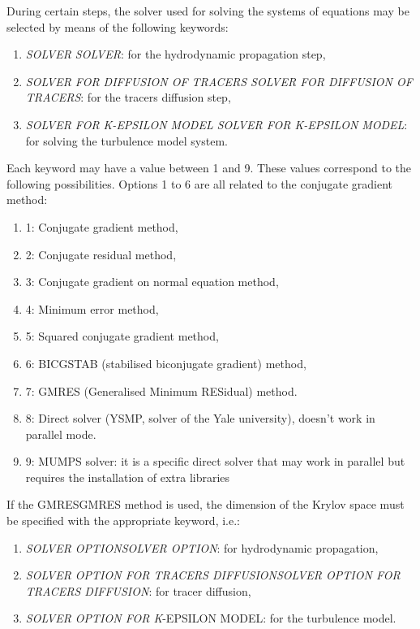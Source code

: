 \documentclass{article} %
\begin{document}
 During certain steps, the solver used for solving the systems of equations may be selected by means of the following keywords:

\begin{enumerate}
\item  \textit{SOLVER SOLVER}: for the hydrodynamic propagation step,

\item  \textit{SOLVER FOR DIFFUSION OF TRACERS SOLVER FOR DIFFUSION OF TRACERS}: for the tracers diffusion step,

\item  \textit{SOLVER FOR K-EPSILON  MODEL SOLVER FOR K-EPSILON}  \textit{MODEL}: for solving the turbulence model system.
\end{enumerate}

 Each keyword may have a value between 1 and 9. These values correspond to the following possibilities. Options 1 to 6 are all related to the conjugate gradient method:

\begin{enumerate}
\item  1: Conjugate gradient method,

\item  2: Conjugate residual method,

\item  3: Conjugate gradient on normal equation method,

\item  4: Minimum error method,

\item  5: Squared conjugate gradient method,

\item  6: BICGSTAB (stabilised biconjugate gradient) method,

\item  7: GMRES (Generalised Minimum RESidual) method.

\item  8: Direct solver (YSMP, solver of the Yale university), doesn't work in parallel mode.

\item  9: MUMPS solver: it is a specific direct solver that may work in parallel but requires the installation of extra libraries
\end{enumerate}

 If the GMRESGMRES method is used, the dimension of the Krylov space must be specified with the appropriate keyword, i.e.:

\begin{enumerate}
\item  \textit{SOLVER OPTIONSOLVER OPTION}: for hydrodynamic propagation,

\item  \textit{SOLVER OPTION FOR TRACERS DIFFUSIONSOLVER OPTION FOR TRACERS DIFFUSION}: for tracer diffusion,

\item  \textit{SOLVER OPTION FOR K}-EPSILON MODEL: for the turbulence model.
\end{enumerate}
\end{document}
